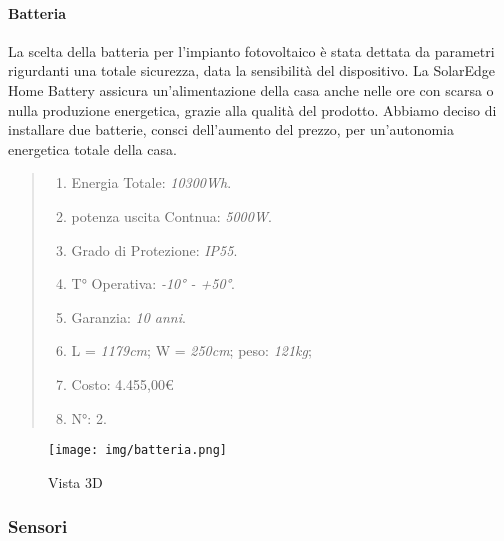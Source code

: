 \documentclass[italian, 12pt, a4paper]{article}
\begin{document}
\paragraph{Batteria}
La scelta della batteria per l'impianto fotovoltaico è stata dettata da parametri rigurdanti una totale sicurezza, data la sensibilità del dispositivo. La SolarEdge Home Battery assicura un'alimentazione della casa anche nelle ore con scarsa o nulla produzione energetica, grazie alla qualità del prodotto. Abbiamo deciso di installare due batterie, consci dell'aumento del prezzo, per un'autonomia energetica totale della casa. 
\begin{quote}
    \begin{enumerate}
        \item Energia Totale: \emph{10300Wh}.
        \item potenza uscita Contnua: \emph{5000W}.
        \item Grado di Protezione: \emph{IP55}.
        \item T° Operativa: \emph{-10° - +50°}.
        \item Garanzia: \emph{10 anni}.
        \item L = \emph{1179cm}; W = \emph{250cm}; peso: \emph{121kg};
        \item Costo: 4.455,00€
        \item N°: 2.
    \end{enumerate}
\end{quote}
\begin{figure}[h]
    \centering
    \texttt{[image: img/batteria.png]}
    \caption{Vista 3D}\label{fig:batteria}
\end{figure}
\clearpage
\subsubsection{Sensori}
\end{document}
